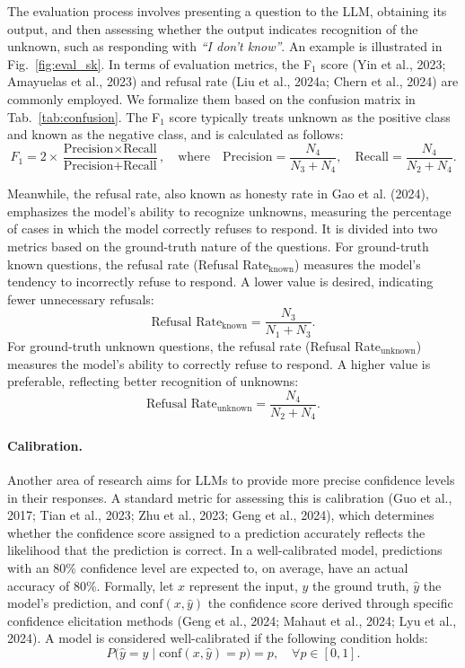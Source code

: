 The evaluation process involves presenting a question to the LLM, obtaining its output, and then assessing whether the output indicates recognition of the unknown, such as responding with \emph{``I don't know''}. An example is illustrated in Fig.~\ref{fig:eval_sk}. In terms of evaluation metrics, the F$_1$ score (Yin et al., 2023; Amayuelas et al., 2023) and refusal rate (Liu et al., 2024a; Chern et al., 2024) are commonly employed. We formalize them based on the confusion matrix in Tab.~\ref{tab:confusion}. The F$_1$ score typically treats unknown as the positive class and known as the negative class, and is calculated as follows:
\begin{equation}
F_1 = 2 \times \frac{\text{Precision} \times \text{Recall}}{\text{Precision} + \text{Recall}}, \quad \text{where} \quad \text{Precision} = \frac{N_4}{N_3 + N_4}, \quad \text{Recall} = \frac{N_4}{N_2 + N_4}.
\end{equation}

Meanwhile, the refusal rate, also known as honesty rate in Gao et al. (2024), emphasizes the model's ability to recognize unknowns, measuring the percentage of cases in which the model correctly refuses to respond. It is divided into two metrics based on the ground-truth nature of the questions. For ground-truth known questions, the refusal rate (Refusal Rate$_{\text{known}}$) measures the model's tendency to incorrectly refuse to respond. A lower value is desired, indicating fewer unnecessary refusals:
\begin{equation}
\text{Refusal Rate}_{\text{known}} = \frac{N_3}{N_1 + N_3}.
\end{equation}
For ground-truth unknown questions, the refusal rate (Refusal Rate$_{\text{unknown}}$) measures the model's ability to correctly refuse to respond. A higher value is preferable, reflecting better recognition of unknowns:
\begin{equation}
\text{Refusal Rate}_{\text{unknown}} = \frac{N_4}{N_2 + N_4}.
\end{equation}

\paragraph{Calibration.} Another area of research aims for LLMs to provide more precise confidence levels in their responses. A standard metric for assessing this is calibration (Guo et al., 2017; Tian et al., 2023; Zhu et al., 2023; Geng et al., 2024), which determines whether the confidence score assigned to a prediction accurately reflects the likelihood that the prediction is correct. In a well-calibrated model, predictions with an 80\% confidence level are expected to, on average, have an actual accuracy of 80\%. Formally, let $x$ represent the input, $y$ the ground truth, $\hat{y}$ the model's prediction, and $\text{conf}(x, \hat{y})$ the confidence score derived through specific confidence elicitation methods (Geng et al., 2024; Mahaut et al., 2024; Lyu et al., 2024). A model is considered well-calibrated if the following condition holds:
\begin{equation}
P\big(\hat{y} = y \mid \text{conf}(x, \hat{y}) = p\big) = p, \quad \forall p \in [0, 1].
\end{equation}

